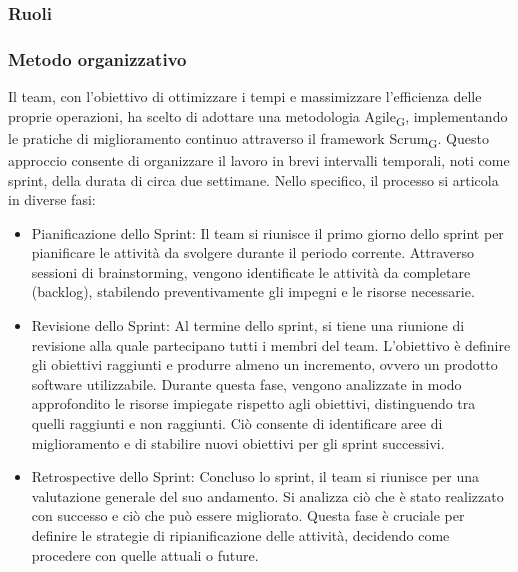 \documentclass{article}
\begin{document}
\subsubsection{Ruoli}
\subsubsection{Metodo organizzativo}
Il team, con l'obiettivo di ottimizzare i tempi e massimizzare l'efficienza delle proprie operazioni, ha scelto di adottare una metodologia Agile\textsubscript{G}, implementando le pratiche di miglioramento continuo attraverso il framework Scrum\textsubscript{G}. Questo approccio consente di organizzare il lavoro in brevi intervalli temporali, noti come sprint, della durata di circa due settimane. Nello specifico, il processo si articola in diverse fasi:
\begin{itemize}
    \item Pianificazione dello Sprint: Il team si riunisce il primo giorno dello sprint per pianificare le attività da svolgere durante il periodo corrente. Attraverso sessioni di brainstorming, vengono identificate le attività da completare (backlog), stabilendo preventivamente gli impegni e le risorse necessarie.
    \item Revisione dello Sprint: Al termine dello sprint, si tiene una riunione di revisione alla quale partecipano tutti i membri del team. L'obiettivo è definire gli obiettivi raggiunti e produrre almeno un incremento, ovvero un prodotto software utilizzabile. Durante questa fase, vengono analizzate in modo approfondito le risorse impiegate rispetto agli obiettivi, distinguendo tra quelli raggiunti e non raggiunti. Ciò consente di identificare aree di miglioramento e di stabilire nuovi obiettivi per gli sprint successivi.
    \item Retrospective dello Sprint: Concluso lo sprint, il team si riunisce per una valutazione generale del suo andamento. Si analizza ciò che è stato realizzato con successo e ciò che può essere migliorato. Questa fase è cruciale per definire le strategie di ripianificazione delle attività, decidendo come procedere con quelle attuali o future.
\end{itemize}
\end{document}
